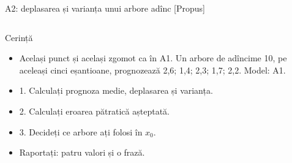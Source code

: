 \begin{frame}{A2: deplasarea și varianța unui arbore adînc [Propus]}
\propsub
\itemsize{\scriptsize}
\begin{columns}[T]
\begin{column}{\taskw}
\begin{block}{Cerință}
\begin{itemize}
    \item Același punct și același zgomot ca în A1. Un arbore de adîncime 10, pe aceleași cinci eșantioane, prognozează 2,6; 1,4; 2,3; 1,7; 2,2. Model: A1.
    \item 1. Calculați prognoza medie, deplasarea și varianța.
    \item 2. Calculați eroarea pătratică așteptată.
    \item 3. Decideți ce arbore ați folosi în $x_0$.
    \item Raportați: patru valori și o frază.
\end{itemize}
\end{block}
\end{column}
\begin{column}{\solw}
\end{column}
\end{columns}
\end{frame}

